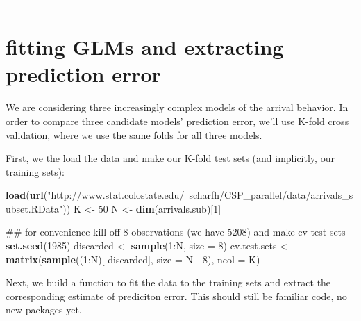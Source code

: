 \documentclass[]{article}
\newenvironment{Shaded}{\begin{snugshade}}{\end{snugshade}}
\newcommand{\KeywordTok}[1]{\textcolor[rgb]{0.13,0.29,0.53}{\textbf{{#1}}}}
\newcommand{\DataTypeTok}[1]{\textcolor[rgb]{0.13,0.29,0.53}{{#1}}}
\newcommand{\DecValTok}[1]{\textcolor[rgb]{0.00,0.00,0.81}{{#1}}}
\newcommand{\StringTok}[1]{\textcolor[rgb]{0.31,0.60,0.02}{{#1}}}
\newcommand{\NormalTok}[1]{{#1}}
\begin{document}
\begin{center}\rule{0.5\linewidth}{\linethickness}\end{center}

\section{fitting GLMs and extracting prediction
error}\label{fitting-glms-and-extracting-prediction-error}

We are considering three increasingly complex models of the arrival
behavior. In order to compare three candidate models' prediction error,
we'll use K-fold cross validation, where we use the same folds for all
three models.

First, we the load the data and make our K-fold test sets (and
implicitly, our training sets):

\begin{Shaded}
\begin{Highlighting}[]
\KeywordTok{load}\NormalTok{(}\KeywordTok{url}\NormalTok{(}\StringTok{"http://www.stat.colostate.edu/~scharfh/CSP_parallel/data/arrivals_subset.RData"}\NormalTok{))}
\NormalTok{K <-}\StringTok{ }\DecValTok{50}
\NormalTok{N <-}\StringTok{ }\KeywordTok{dim}\NormalTok{(arrivals.sub)[}\DecValTok{1}\NormalTok{]}

\NormalTok{## for convenience kill off 8 observations (we have 5208) and make cv test sets}
\KeywordTok{set.seed}\NormalTok{(}\DecValTok{1985}\NormalTok{)}
\NormalTok{discarded <-}\StringTok{ }\KeywordTok{sample}\NormalTok{(}\DecValTok{1}\NormalTok{:N, }\DataTypeTok{size =} \DecValTok{8}\NormalTok{)}
\NormalTok{cv.test.sets <-}\StringTok{ }\KeywordTok{matrix}\NormalTok{(}\KeywordTok{sample}\NormalTok{((}\DecValTok{1}\NormalTok{:N)[-discarded], }\DataTypeTok{size =} \NormalTok{N -}\StringTok{ }\DecValTok{8}\NormalTok{), }\DataTypeTok{ncol =} \NormalTok{K)}
\end{Highlighting}
\end{Shaded}

Next, we build a function to fit the data to the training sets and
extract the corresponding estimate of prediciton error. This should
still be familiar code, no new packages yet.
\end{document}
